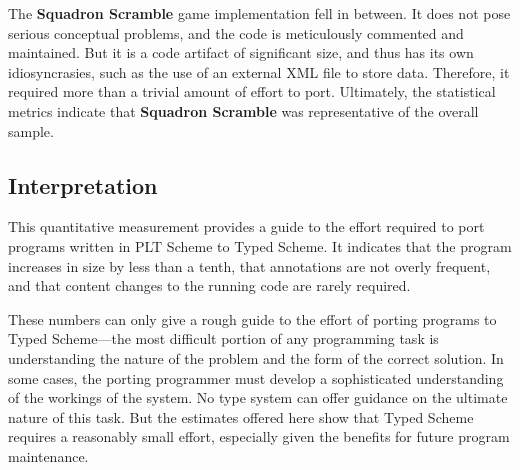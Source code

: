 \begin{schemeregion}
\begin{itemize}
The {\bf Squadron Scramble} game implementation fell in between.  It does not
pose serious conceptual problems, and the code is meticulously
commented and maintained.  But it is a code artifact of significant
size, and thus has its own idiosyncrasies, such as the use of an
external XML file to store data.  Therefore, it required more than a
trivial amount of effort to port.   Ultimately, the statistical
metrics indicate that {\bf Squadron Scramble} was representative of the
overall sample.  

\end{itemize}




\subsection{Interpretation}
This quantitative measurement provides a guide to the effort required to port programs
written in PLT Scheme to Typed Scheme.  It indicates that the program
increases in size by less than a tenth, that annotations are not overly frequent,
 and that content changes to the running code are rarely
required.  

These numbers can only give a rough guide to the effort of
porting programs to Typed Scheme---the most difficult portion of any
programming task is understanding the nature of the problem and the
form of the correct solution. In some cases, the porting programmer
must develop a sophisticated understanding of the workings of the
system.  No type system can offer guidance on
the ultimate nature of this task.  But the estimates offered
here show that Typed Scheme  requires a reasonably small effort,
especially given the benefits for future program maintenance.  
\end{schemeregion}
